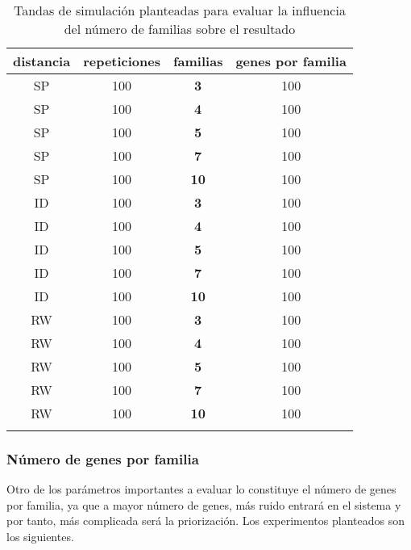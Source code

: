 \bigskip
\begin{small}
\begin{center}
\begin{table}[H]
\begin{tabular}{cccc}
\textbf{distancia} & \textbf{repeticiones} & \textbf{familias} & \textbf{genes por familia}\tabularnewline 
\hline
\hline
\addlinespace[0.2cm]
SP	 & 100 & \textbf{3} & 100 \tabularnewline 
SP	 & 100 & \textbf{4} & 100 \tabularnewline
SP	 & 100 & \textbf{5} & 100 \tabularnewline
SP	 & 100 & \textbf{7} & 100 \tabularnewline
SP	 & 100 & \textbf{10} & 100 \tabularnewline
\addlinespace[0.2cm]
\hline
\addlinespace[0.2cm]
ID	 & 100 & \textbf{3} & 100 \tabularnewline 
ID	 & 100 & \textbf{4} & 100 \tabularnewline
ID	 & 100 & \textbf{5} & 100 \tabularnewline
ID	 & 100 & \textbf{7} & 100 \tabularnewline
ID	 & 100 & \textbf{10} & 100 \tabularnewline
\addlinespace[0.2cm]
\hline
\addlinespace[0.2cm]
RW & 100 & \textbf{3} & 100 \tabularnewline 
RW & 100 & \textbf{4} & 100 \tabularnewline
RW & 100 & \textbf{5} & 100 \tabularnewline
RW & 100 & \textbf{7} & 100 \tabularnewline
RW & 100 & \textbf{10} & 100 \tabularnewline
\addlinespace[0.2cm]
\hline
\end{tabular}
\caption{Tandas de simulación planteadas para evaluar la influencia del número de familias sobre el resultado}
\label{tab:tabla_familias}
\end{table}
\end{center}
\end{small}
\bigskip

\subsubsection{Número de genes por familia}
Otro de los parámetros importantes a evaluar lo constituye el número de genes por familia, ya que a mayor número de genes, más ruido entrará en el sistema y por tanto, más complicada será la priorización. Los experimentos planteados son los siguientes.

